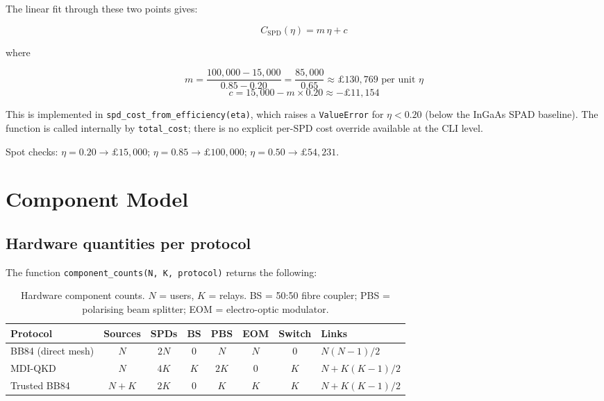\documentclass[12pt,a4paper]{article}
\begin{document}
The linear fit through these two points gives:

\[
C_{\mathrm{SPD}}(\eta) = m\,\eta + c
\]

where

\[
m = \frac{100{,}000 - 15{,}000}{0.85 - 0.20} = \frac{85{,}000}{0.65}
  \approx \pounds130{,}769 \text{ per unit }\eta
\]
\[
c = 15{,}000 - m \times 0.20 \approx -\pounds11{,}154
\]

This is implemented in \texttt{spd\_cost\_from\_efficiency(eta)}, which raises a
\texttt{ValueError} for $\eta < 0.20$ (below the InGaAs SPAD baseline).
The function is called internally by \texttt{total\_cost}; there is no
explicit per-SPD cost override available at the CLI level.

Spot checks: $\eta = 0.20 \to \pounds15{,}000$;\quad
$\eta = 0.85 \to \pounds100{,}000$;\quad
$\eta = 0.50 \to \pounds54{,}231$.

\section{Component Model}

\subsection{Hardware quantities per protocol}

The function \texttt{component\_counts(N, K, protocol)} returns the following:

\begin{table}[h!]
\centering
\begin{tabular}{lccccccl}
\toprule
Protocol & Sources & SPDs & BS & PBS & EOM & Switch & Links \\
\midrule
BB84 (direct mesh) & $N$ & $2N$ & $0$ & $N$ & $N$ & $0$ & $N(N{-}1)/2$ \\
MDI-QKD            & $N$ & $4K$ & $K$ & $2K$ & $0$ & $K$ & $N + K(K{-}1)/2$ \\
Trusted BB84       & $N+K$ & $2K$ & $0$ & $K$ & $K$ & $K$ & $N + K(K{-}1)/2$ \\
\bottomrule
\end{tabular}
\caption{Hardware component counts. $N$ = users, $K$ = relays.
BS = 50:50 fibre coupler; PBS = polarising beam splitter;
EOM = electro-optic modulator.}
\end{table}
\end{document}
